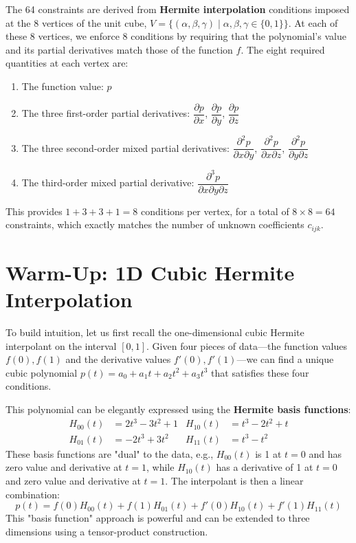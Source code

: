 \documentclass[12pt]{article}
\newcommand{\p}{\partial} %
\begin{document}
The 64 constraints are derived from \textbf{Hermite interpolation} conditions imposed at the 8 vertices of the unit cube, $V = \{ (\alpha, \beta, \gamma) \mid \alpha, \beta, \gamma \in \{0, 1\} \}$. At each of these 8 vertices, we enforce 8 conditions by requiring that the polynomial's value and its partial derivatives match those of the function $f$. The eight required quantities at each vertex are:
\begin{enumerate}
    \item The function value: $p$
    \item The three first-order partial derivatives: $\dfrac{\p p}{\p x}$, $\dfrac{\p p}{\p y}$, $\dfrac{\p p}{\p z}$
    \item The three second-order mixed partial derivatives: $\dfrac{\p^2 p}{\p x \p y}$, $\dfrac{\p^2 p}{\p x \p z}$, $\dfrac{\p^2 p}{\p y \p z}$
    \item The third-order mixed partial derivative: $\dfrac{\p^3 p}{\p x \p y \p z}$
\end{enumerate}
This provides $1+3+3+1 = 8$ conditions per vertex, for a total of $8 \times 8 = 64$ constraints, which exactly matches the number of unknown coefficients $c_{ijk}$.

\section{Warm-Up: 1D Cubic Hermite Interpolation}
\label{sec:1d_warmup}

To build intuition, let us first recall the one-dimensional cubic Hermite interpolant on the interval $[0,1]$. Given four pieces of data—the function values $f(0), f(1)$ and the derivative values $f'(0), f'(1)$—we can find a unique cubic polynomial $p(t) = a_0 + a_1 t + a_2 t^2 + a_3 t^3$ that satisfies these four conditions.

This polynomial can be elegantly expressed using the \textbf{Hermite basis functions}:
\begin{align}
    H_{00}(t) &= 2t^3 - 3t^2 + 1 & H_{10}(t) &= t^3 - 2t^2 + t \\
    H_{01}(t) &= -2t^3 + 3t^2 & H_{11}(t) &= t^3 - t^2
\end{align}
These basis functions are "dual" to the data, e.g., $H_{00}(t)$ is 1 at $t=0$ and has zero value and derivative at $t=1$, while $H_{10}(t)$ has a derivative of 1 at $t=0$ and zero value and derivative at $t=1$. The interpolant is then a linear combination:
\begin{equation}
    p(t) = f(0) H_{00}(t) + f(1) H_{01}(t) + f'(0) H_{10}(t) + f'(1) H_{11}(t)
\end{equation}
This "basis function" approach is powerful and can be extended to three dimensions using a tensor-product construction.
\end{document}
